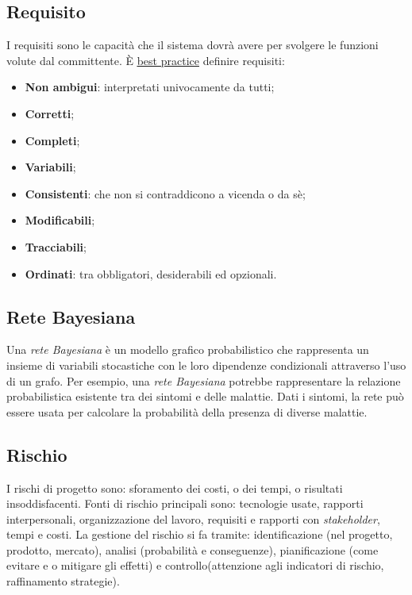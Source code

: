 	\subsection{Requisito}
	\label{sec:requisito}
	I requisiti sono le capacità che il sistema dovrà avere per svolgere le funzioni volute dal committente. È \underline{\hyperref[sec:bestpractice]{best practice}} definire requisiti:
	\begin{itemize}
	\item \textbf{Non ambigui}: interpretati univocamente da tutti;
	\item \textbf{Corretti};
	\item \textbf{Completi};
	\item \textbf{Variabili};
	\item \textbf{Consistenti}: che non si contraddicono a vicenda o da sè;
	\item \textbf{Modificabili};
	\item \textbf{Tracciabili};
	\item \textbf{Ordinati}: tra obbligatori, desiderabili ed opzionali.
	\end{itemize}


	\subsection{Rete Bayesiana}
	\label{sec:retebayes}
	Una \emph{rete Bayesiana} è un modello grafico probabilistico che rappresenta un insieme di variabili stocastiche con le loro dipendenze condizionali attraverso l'uso di un grafo. Per esempio, una \emph{rete Bayesiana} potrebbe rappresentare la relazione probabilistica esistente tra dei sintomi e delle malattie. Dati i sintomi, la rete può essere usata per calcolare la probabilità della presenza di diverse malattie.


	\subsection{Rischio}
	\label{sec:rischio}
	I rischi di progetto sono: sforamento dei costi,  o dei tempi, o risultati insoddisfacenti. Fonti di rischio principali sono:
	tecnologie usate, rapporti interpersonali, organizzazione del lavoro, requisiti e rapporti con  \emph{stakeholder}, tempi e costi.
	La gestione del rischio si fa tramite:
	identificazione (nel progetto, prodotto, mercato), analisi (probabilità e conseguenze), pianificazione (come evitare e o mitigare gli effetti) e controllo(attenzione agli indicatori di rischio, raffinamento strategie).


